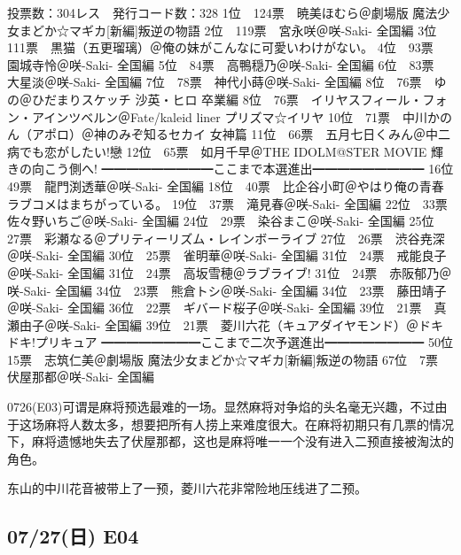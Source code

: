 	投票数：304レス　発行コード数：328
	1位　124票　暁美ほむら＠劇場版 魔法少女まどか☆マギカ[新編]叛逆の物語
	2位　119票　宮永咲＠咲-Saki- 全国編
	3位　111票　黒猫（五更瑠璃）＠俺の妹がこんなに可愛いわけがない。
	4位　93票　園城寺怜＠咲-Saki- 全国編
	5位　84票　高鴨穏乃＠咲-Saki- 全国編
	6位　83票　大星淡＠咲-Saki- 全国編
	7位　78票　神代小蒔＠咲-Saki- 全国編
	8位　76票　ゆの＠ひだまりスケッチ 沙英・ヒロ 卒業編
	8位　76票　イリヤスフィール・フォン・アインツベルン＠Fate/kaleid liner プリズマ☆イリヤ
	10位　71票　中川かのん（アポロ）＠神のみぞ知るセカイ 女神篇
	11位　66票　五月七日くみん＠中二病でも恋がしたい!戀
	12位　65票　如月千早＠THE IDOLM@STER MOVIE 輝きの向こう側へ!
	━━━━━━━━━ここまで本選進出━━━━━━━━━
	16位　49票　龍門渕透華＠咲-Saki- 全国編
	18位　40票　比企谷小町＠やはり俺の青春ラブコメはまちがっている。
	19位　37票　滝見春＠咲-Saki- 全国編
	22位　33票　佐々野いちご＠咲-Saki- 全国編
	24位　29票　染谷まこ＠咲-Saki- 全国編
	25位　27票　彩瀬なる＠プリティーリズム・レインボーライブ
	27位　26票　渋谷尭深＠咲-Saki- 全国編
	30位　25票　雀明華＠咲-Saki- 全国編
	31位　24票　戒能良子＠咲-Saki- 全国編
	31位　24票　高坂雪穂＠ラブライブ!
	31位　24票　赤阪郁乃＠咲-Saki- 全国編
	34位　23票　熊倉トシ＠咲-Saki- 全国編
	34位　23票　藤田靖子＠咲-Saki- 全国編
	36位　22票　ギバード桜子＠咲-Saki- 全国編
	39位　21票　真瀬由子＠咲-Saki- 全国編
	39位　21票　菱川六花（キュアダイヤモンド）＠ドキドキ!プリキュア
	━━━━━━━━ここまで二次予選進出━━━━━━━━
	50位　15票　志筑仁美＠劇場版 魔法少女まどか☆マギカ[新編]叛逆の物語
	67位　7票　伏屋那都＠咲-Saki- 全国編

0726(E03)可谓是麻将预选最难的一场。显然麻将对争焰的头名毫无兴趣，不过由于这场麻将人数太多，想要把所有人捞上来难度很大。在麻将初期只有几票的情况下，麻将遗憾地失去了伏屋那都，这也是麻将唯一一个没有进入二预直接被淘汰的角色。

东山的中川花音被带上了一预，菱川六花非常险地压线进了二预。

\subsection{07/27(日) E04}


